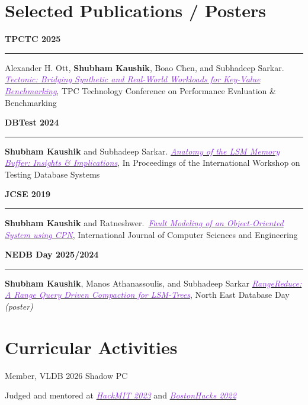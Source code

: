 \documentclass[11pt,a4paper,calibri]{moderncv}
\newcommand{\publication}[2]{
\noindent
  \begin{minipage}[c]{0.12\textwidth} \centering \textbf{#1} \end{minipage}%
  \hspace{0.005\textwidth}
  \begin{minipage}[c]{0.02\textwidth} \textcolor{lightgray}{\rule{1pt}{0.75cm}} \end{minipage}%
  \begin{minipage}[c]{0.85\textwidth} \raggedright{#2} \end{minipage}%
}
\begin{document}
% 

\vspace{-0.7em}
\section{Selected Publications / Posters}
\publication{TPCTC 2025}{Alexander H. Ott, \textbf{Shubham Kaushik}, Boao Chen, and Subhadeep Sarkar. \href{https://api.semanticscholar.org/CorpusID:282201482}{\textit{\textcolor{blueviolet}{Tectonic: Bridging Synthetic and Real-World Workloads for Key-Value Benchmarking}}}, TPC Technology Conference on Performance Evaluation \& Benchmarking}

\publication{DBTest 2024}{\textbf{Shubham Kaushik} and Subhadeep Sarkar. \href{https://doi.org/10.1145/3662165.3662766}{\textit{\textcolor{blueviolet}{Anatomy
        of the LSM Memory Buffer: Insights \& Implications}}}, In Proceedings of the International Workshop on Testing Database Systems}

\mediumspace{}

\publication{JCSE 2019}{\textbf{Shubham Kaushik} and Ratneshwer.\ \href{https://doi.org/10.26438/ijcse/v7i5.18281845}{\textit{\textcolor{blueviolet}{Fault
        Modeling of an Object-Oriented System using CPN}}}, International Journal of Computer Sciences and Engineering}

\mediumspace{}

\publication{NEDB Day 2025/2024}{\textbf{Shubham Kaushik}, Manos Athanassoulis, and Subhadeep Sarkar
  \href{https://bu-disc.github.io/nedbday/2024/download/posters/RangeReduce_A_Range_Query_Driven_Compaction_for_LSM-Trees.pdf}
  {\textit{\textcolor{blueviolet}{RangeReduce: A Range Query Driven Compaction for LSM-Trees}}}, North East Database Day \hfill \textit{(poster)}}


\vspace{-0.7em}
\section{Curricular Activities}
\begin{itemize*}[itemjoin=\hspace{6em}]
  \item Member, VLDB 2026 Shadow PC
  \item Judged and mentored at \href{https://hackmit.org/}{\textcolor{blueviolet}{\textit{HackMIT 2023}}} and \href{https://bostonhacks.io/}
	{\textit{\textcolor{blueviolet}{BostonHacks 2022}}}
\end{itemize*}
\end{document}
